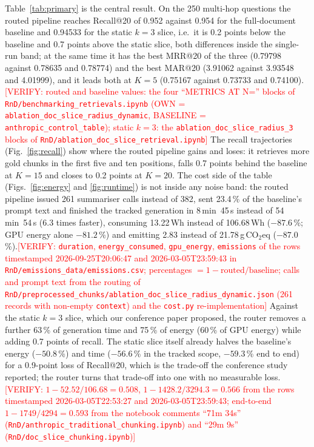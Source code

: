 \documentclass[pdflatex,sn-mathphys-num]{sn-jnl}
\makeatletter
\newcommand{\todo}[1]{\textcolor{red}{#1}}
\newcommand{\verify}[1]{\todo{[VERIFY: #1]}}
\newcommand{\gco}{g\,CO$_2$eq}
\newcommand{\Rec}[1]{Recall@#1}
\newcommand{\MRR}[1]{MRR@#1}
\newcommand{\MAR}[1]{MAR@#1}
\theoremstyle{thmstyleone}%
\theoremstyle{thmstylethree}%
\makeatother
\begin{document}
Table~\ref{tab:primary} is the central result. On the 250 multi-hop questions the routed pipeline reaches \Rec{20} of 0.952 against 0.954 for the full-document baseline and 0.94533 for the static $k=3$ slice, i.e.\ it is 0.2 points below the baseline and 0.7 points above the static slice, both differences inside the single-run band; at the same time it has the best \MRR{20} of the three (0.79798 against 0.78635 and 0.78774) and the best \MAR{20} (3.91062 against 3.93548 and 4.01999), and it leads both at $K=5$ (0.75167 against 0.73733 and 0.74100).\verify{routed and baseline values: the four ``METRICS AT N='' blocks of \texttt{RnD/benchmarking\_retrievals.ipynb} (OWN = \texttt{ablation\_doc\_slice\_radius\_dynamic}, BASELINE = \texttt{anthropic\_control\_table}); static $k=3$: the \texttt{ablation\_doc\_slice\_radius\_3} blocks of \texttt{RnD/ablation\_doc\_slice\_retrieval.ipynb}} The recall trajectories (Fig.~\ref{fig:recall}) show where the routed pipeline gains and loses: it retrieves more gold chunks in the first five and ten positions, falls 0.7 points behind the baseline at $K=15$ and closes to 0.2 points at $K=20$. The cost side of the table (Figs.~\ref{fig:energy} and \ref{fig:runtime}) is not inside any noise band: the routed pipeline issued 261 summariser calls instead of 382, sent 23.4\,\% of the baseline's prompt text and finished the tracked generation in 8\,min~45\,s instead of 54\,min~54\,s (6.3 times faster), consuming 13.22\,Wh instead of 106.68\,Wh ($-87.6$\,\%; GPU energy alone $-81.2$\,\%) and emitting 2.83 instead of 21.78\,\gco{} ($-87.0$\,\%).\verify{\texttt{duration}, \texttt{energy\_consumed}, \texttt{gpu\_energy}, \texttt{emissions} of the rows timestamped 2026-09-25T20:06:47 and 2026-03-05T23:59:43 in \texttt{RnD/emissions\_data/emissions.csv}; percentages $=1-\text{routed}/\text{baseline}$; calls and prompt text from the routing of \texttt{RnD/preprocessed\_chunks/ablation\_doc\_slice\_radius\_dynamic.json} (261 records with non-empty \texttt{context}) and the \texttt{cost.py} re-implementation} Against the static $k=3$ slice, which our conference paper proposed, the router removes a further 63\,\% of generation time and 75\,\% of energy (60\,\% of GPU energy) while adding 0.7 points of recall. The static slice itself already halves the baseline's energy ($-50.8$\,\%) and time ($-56.6$\,\% in the tracked scope, $-59.3$\,\% end to end) for a 0.9-point loss of \Rec{20}, which is the trade-off the conference study reported; the router turns that trade-off into one with no measurable loss.\verify{$1-52.52/106.68=0.508$, $1-1428.2/3294.3=0.566$ from the rows timestamped 2026-03-05T22:53:27 and 2026-03-05T23:59:43; end-to-end $1-1749/4294=0.593$ from the notebook comments ``71m 34s'' (\texttt{RnD/anthropic\_traditional\_chunking.ipynb}) and ``29m 9s'' (\texttt{RnD/doc\_slice\_chunking.ipynb})}
\end{document}
